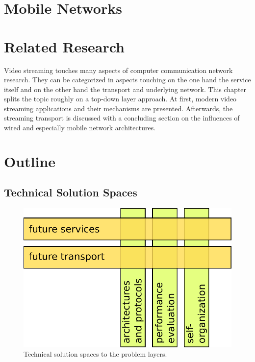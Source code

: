 \section{Mobile Networks}



\section{Related Research}

Video streaming touches many aspects of computer communication network research. They can be categorized in aspects touching on the one hand the service itself and on the other hand  the transport and underlying network. This chapter splits the topic roughly on a top-down layer approach. At first, modern video streaming applications and their mechanisms are presented. Afterwards, the streaming transport is discussed with a concluding section on the influences of wired and especially mobile network architectures.





\section{Outline}




\subsection{Technical Solution Spaces}


\begin{figure}[htbp]
    \centering
    \includegraphics[width=.8\textwidth]{images/hv-topics-new.pdf}
    \caption{Technical solution spaces to the problem layers.}
    \label{c1:fig:hv-topics}
\end{figure}

